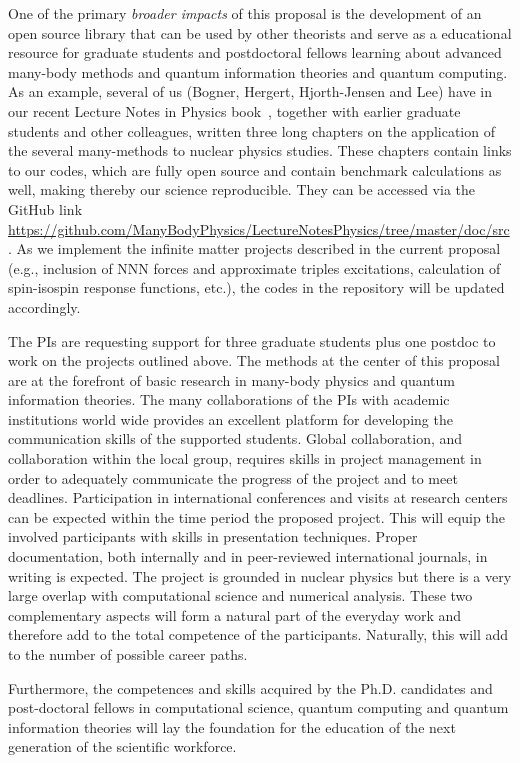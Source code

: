 \documentclass[10pt]{article}
\begin{document}
One of the primary \emph{broader impacts} of this proposal
is the development of an
open source library that can be used by other theorists and serve as a
educational resource for graduate students and postdoctoral fellows learning about
advanced many-body methods and quantum information theories and quantum computing.  As an example, several of us (Bogner, Hergert, Hjorth-Jensen and Lee) have in our recent Lecture
Notes in Physics book~\cite{lnp}, together with earlier graduate
students and other colleagues, written three long chapters on the
application of the several many-methods to nuclear physics studies. These
chapters contain links to our codes, which are fully open source and
contain benchmark calculations as well, making thereby our science
reproducible. They can be accessed via the GitHub link
\url{https://github.com/ManyBodyPhysics/LectureNotesPhysics/tree/master/doc/src}. As
we implement the infinite matter projects described in the current
proposal (e.g., inclusion of NNN forces and approximate triples
excitations, calculation of spin-isospin response functions, etc.),
the codes in the repository will be updated accordingly.

The PIs are requesting support for three graduate students plus one
postdoc to work on the projects outlined above. The methods at the
center of this proposal are at the forefront of basic research in
many-body physics and quantum information theories. The many
collaborations of the PIs with academic institutions world wide
provides an excellent platform for developing the communication skills
of the supported students. Global collaboration, and collaboration
within the local group, requires skills in project management in order
to adequately communicate the progress of the project and to meet
deadlines. Participation in international conferences and visits at
research centers can be expected within the time period the proposed
project. This will equip the involved participants with skills in
presentation techniques.  Proper documentation, both internally and in
peer-reviewed international journals, in writing is expected. The
project is grounded in nuclear physics but there is a very large
overlap with computational science and numerical analysis. These two
complementary aspects will form a natural part of the everyday work
and therefore add to the total competence of the
participants. Naturally, this will add to the number of possible
career paths.

Furthermore, the competences and skills acquired by the Ph.D. candidates and post-doctoral fellows in computational science, quantum computing and quantum information theories will lay the foundation for the education of the next generation of the scientific workforce. 
\end{document}
